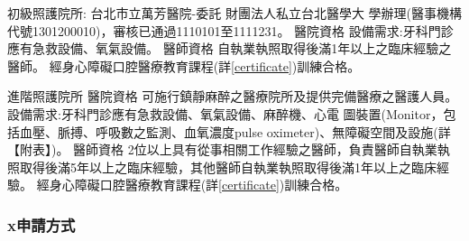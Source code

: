 \begin{outline}

\1 初級照護院所:
台北市立萬芳醫院-委託
財團法人私立台北醫學大
學辦理(醫事機構代號1301200010)，審核已通過1110101至1111231。
\2 醫院資格
    \3 設備需求:牙科門診應有急救設備、氧氣設備。
\2 醫師資格
    \3 %
    自執業執照取得後滿1年以上之臨床經驗之醫師。
    \3 經身心障礙口腔醫療教育課程(詳\ref{certificate})訓練合格。

\1 進階照護院所 %
\2 醫院資格
    \3 可施行鎮靜麻醉之醫療院所及提供完備醫療之醫護人員。
    \3 設備需求:牙科門診應有急救設備、氧氣設備、麻醉機、心電 圖裝置(Monitor，包括血壓、脈搏、呼吸數之監測、血氧濃度pulse oximeter)、無障礙空間及設施(詳【附表】)。
\2 醫師資格
    \3 2位以上具有從事相關工作經驗之醫師，負責醫師自執業執照取得後滿5年以上之臨床經驗，其他醫師自執業執照取得後滿1年以上之臨床經驗。
    \3 經身心障礙口腔醫療教育課程(詳\ref{certificate})訓練合格。
\end{outline}

\subsubsection{x申請方式}